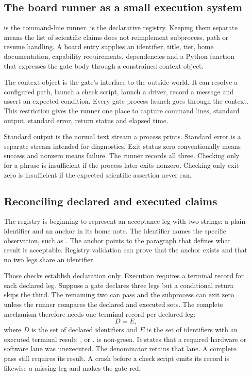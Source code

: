 \subsection{The board runner as a small execution system}

 is the command-line runner.
 is the declarative registry.  Keeping them separate
means the list of scientific claims does not reimplement subprocess, path or
resume handling.  A board entry supplies an identifier, title, tier, home
documentation, capability requirements, dependencies and a Python function
that expresses the gate body through a constrained context object.

The context object is the gate's interface to the outside world.  It can
resolve a configured path, launch a check script, launch a driver, record a
message and assert an expected condition.  Every gate process launch goes
through the context.  This restriction gives the runner one place to
capture command lines, standard output, standard error, return status and
elapsed time.

Standard output is the normal text stream a process prints.  Standard error is
a separate stream intended for diagnostics.  Exit status zero conventionally
means success and nonzero means failure.  The runner records all three.
Checking only for a phrase is insufficient if the process later exits
nonzero.  Checking only exit zero is insufficient if the expected scientific
assertion never ran.

\subsection{Reconciling declared and executed claims}

The registry is beginning to represent an acceptance leg with two strings: a
plain identifier and an anchor in its home note.  The identifier names the
specific observation, such as .  The anchor
points to the paragraph that defines what result is acceptable.  Registry
validation can prove that the anchor exists and that no two legs share an
identifier.

Those checks establish declaration only.  Execution requires a terminal record
for each declared leg.  Suppose a gate declares three legs but a conditional
return skips the third.  The remaining two can
pass and the subprocess can exit zero unless the runner compares the declared
and executed sets.  The complete mechanism therefore needs one terminal
record per declared leg:
\begin{equation*}
 D=E,
\end{equation*}
where \(D\) is the set of declared identifiers and \(E\) is the set of
identifiers with an executed terminal result: ,  or
.
 is non-green.  It states that a required hardware or
software lane was unexecuted.  The denominator retains that lane.  A complete
pass still requires its result.  A crash before a check script emits its
record is likewise a missing leg and makes the gate red.

